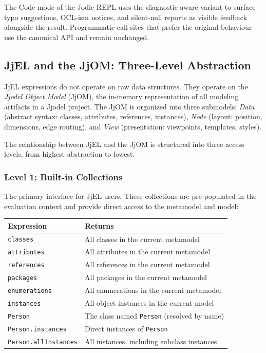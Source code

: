 \documentclass[11pt,a4paper]{article}
\newcommand{\jjel}{\textsf{JjEL}}
\begin{document}
The Code mode of the Jodie REPL uses the diagnostic-aware variant to surface typo suggestions, OCL-ism notices, and silent-null reports as visible feedback alongside the result. Programmatic call sites that prefer the original behaviour use the canonical API and remain unchanged.


\subsection{JjEL and the JjOM: Three-Level Abstraction}\label{sec:jjel-jjom}

\jjel{} expressions do not operate on raw data structures. They operate on the \emph{Jjodel Object Model} (JjOM), the in-memory representation of all modeling artifacts in a Jjodel project. The JjOM is organized into three submodels: \emph{Data} (abstract syntax: classes, attributes, references, instances), \emph{Node} (layout: position, dimensions, edge routing), and \emph{View} (presentation: viewpoints, templates, styles).

The relationship between \jjel{} and the JjOM is structured into three access levels, from highest abstraction to lowest.

\subsubsection{Level 1: Built-in Collections}

The primary interface for \jjel{} users. These collections are pre-populated in the evaluation context and provide direct access to the metamodel and model:

\begin{center}
\begin{tabular}{@{}ll@{}}
\toprule
\textbf{Expression} & \textbf{Returns} \\
\midrule
\texttt{classes} & All classes in the current metamodel \\
\texttt{attributes} & All attributes in the current metamodel \\
\texttt{references} & All references in the current metamodel \\
\texttt{packages} & All packages in the current metamodel \\
\texttt{enumerations} & All enumerations in the current metamodel \\
\texttt{instances} & All object instances in the current model \\
\texttt{Person} & The class named \texttt{Person} (resolved by name) \\
\texttt{Person.instances} & Direct instances of \texttt{Person} \\
\texttt{Person.allInstances} & All instances, including subclass instances \\
\bottomrule
\end{tabular}
\end{center}
\end{document}
